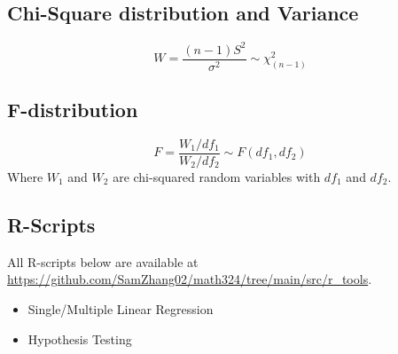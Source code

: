\documentclass[sn-mathphys,Numbered]{sn-jnl}%
\begin{document}
\subsection*{Chi-Square distribution and Variance}
\begin{equation}
    W = \frac{(n-1)S^2}{\sigma^2} \sim \chi^2_{(n-1)}
\end{equation}

\subsection*{F-distribution}
\begin{equation}
    F = \frac{W_1/df_1}{W_2/df_2} \sim F(df_1, df_2)
\end{equation}
Where $W_1$ and $W_2$ are chi-squared random variables with $df_1$ and $df_2$.

\subsection*{R-Scripts}
All R-scripts below are available at
\url{https://github.com/SamZhang02/math324/tree/main/src/r_tools}.
\begin{itemize}
    \item Single/Multiple Linear Regression
    \item Hypothesis Testing
\end{itemize}
\end{document}
